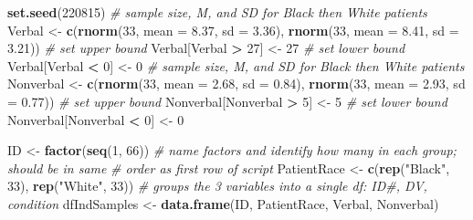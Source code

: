 \documentclass[
  11pt,
]{book}
\newenvironment{Shaded}{\begin{snugshade}}{\end{snugshade}}
\newcommand{\AttributeTok}[1]{\textcolor[rgb]{0.27,0.27,0.27}{#1}}
\newcommand{\CommentTok}[1]{\textcolor[rgb]{0.37,0.37,0.37}{\textit{#1}}}
\newcommand{\DecValTok}[1]{\textcolor[rgb]{0.06,0.06,0.06}{#1}}
\newcommand{\FloatTok}[1]{\textcolor[rgb]{0.06,0.06,0.06}{#1}}
\newcommand{\FunctionTok}[1]{\textcolor[rgb]{0.27,0.27,0.27}{\textbf{#1}}}
\newcommand{\NormalTok}[1]{#1}
\newcommand{\OtherTok}[1]{\textcolor[rgb]{0.37,0.37,0.37}{#1}}
\newcommand{\SpecialCharTok}[1]{\textcolor[rgb]{0.43,0.43,0.43}{\textbf{#1}}}
\newcommand{\StringTok}[1]{\textcolor[rgb]{0.5,0.5,0.5}{#1}}
\begin{document}
\begin{Shaded}
\begin{Highlighting}[]
\FunctionTok{set.seed}\NormalTok{(}\DecValTok{220815}\NormalTok{)}
\CommentTok{\# sample size, M, and SD for Black then White patients}
\NormalTok{Verbal }\OtherTok{\textless{}{-}} \FunctionTok{c}\NormalTok{(}\FunctionTok{rnorm}\NormalTok{(}\DecValTok{33}\NormalTok{, }\AttributeTok{mean =} \FloatTok{8.37}\NormalTok{, }\AttributeTok{sd =} \FloatTok{3.36}\NormalTok{), }\FunctionTok{rnorm}\NormalTok{(}\DecValTok{33}\NormalTok{, }\AttributeTok{mean =} \FloatTok{8.41}\NormalTok{, }\AttributeTok{sd =} \FloatTok{3.21}\NormalTok{))}
\CommentTok{\# set upper bound}
\NormalTok{Verbal[Verbal }\SpecialCharTok{\textgreater{}} \DecValTok{27}\NormalTok{] }\OtherTok{\textless{}{-}} \DecValTok{27}
\CommentTok{\# set lower bound}
\NormalTok{Verbal[Verbal }\SpecialCharTok{\textless{}} \DecValTok{0}\NormalTok{] }\OtherTok{\textless{}{-}} \DecValTok{0}
\CommentTok{\# sample size, M, and SD for Black then White patients}
\NormalTok{Nonverbal }\OtherTok{\textless{}{-}} \FunctionTok{c}\NormalTok{(}\FunctionTok{rnorm}\NormalTok{(}\DecValTok{33}\NormalTok{, }\AttributeTok{mean =} \FloatTok{2.68}\NormalTok{, }\AttributeTok{sd =} \FloatTok{0.84}\NormalTok{), }\FunctionTok{rnorm}\NormalTok{(}\DecValTok{33}\NormalTok{, }\AttributeTok{mean =} \FloatTok{2.93}\NormalTok{,}
    \AttributeTok{sd =} \FloatTok{0.77}\NormalTok{))}
\CommentTok{\# set upper bound}
\NormalTok{Nonverbal[Nonverbal }\SpecialCharTok{\textgreater{}} \DecValTok{5}\NormalTok{] }\OtherTok{\textless{}{-}} \DecValTok{5}
\CommentTok{\# set lower bound}
\NormalTok{Nonverbal[Nonverbal }\SpecialCharTok{\textless{}} \DecValTok{0}\NormalTok{] }\OtherTok{\textless{}{-}} \DecValTok{0}

\NormalTok{ID }\OtherTok{\textless{}{-}} \FunctionTok{factor}\NormalTok{(}\FunctionTok{seq}\NormalTok{(}\DecValTok{1}\NormalTok{, }\DecValTok{66}\NormalTok{))}
\CommentTok{\# name factors and identify how many in each group; should be in same}
\CommentTok{\# order as first row of script}
\NormalTok{PatientRace }\OtherTok{\textless{}{-}} \FunctionTok{c}\NormalTok{(}\FunctionTok{rep}\NormalTok{(}\StringTok{"Black"}\NormalTok{, }\DecValTok{33}\NormalTok{), }\FunctionTok{rep}\NormalTok{(}\StringTok{"White"}\NormalTok{, }\DecValTok{33}\NormalTok{))}
\CommentTok{\# groups the 3 variables into a single df: ID\#, DV, condition}
\NormalTok{dfIndSamples }\OtherTok{\textless{}{-}} \FunctionTok{data.frame}\NormalTok{(ID, PatientRace, Verbal, Nonverbal)}
\end{Highlighting}
\end{Shaded}
\end{document}
